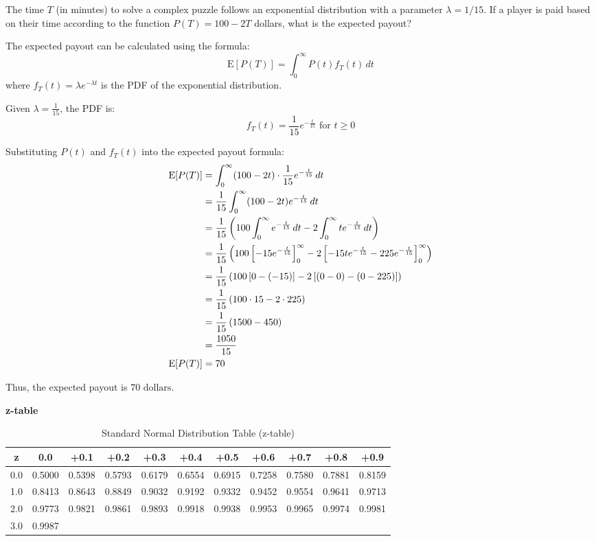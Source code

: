 \documentclass[a4paper, 10pt]{article}
\newcommand{\zScoreTable}[1]{
    \par\noindent \textbf{z-table}
    \begin{table}[h]
        \centering
        \renewcommand{\arraystretch}{#1}
        \begin{tabular}{|c|cccccccccc|}
            \hline
            \textbf{z} & 0.0 & +0.1 & +0.2 & +0.3 & +0.4 & +0.5 & +0.6 & +0.7 & +0.8 & +0.9 \\
            \hline
            0.0 & 0.5000 & 0.5398 & 0.5793 & 0.6179 & 0.6554 & 0.6915 & 0.7258 & 0.7580 & 0.7881 & 0.8159 \\
            1.0 & 0.8413 & 0.8643 & 0.8849 & 0.9032 & 0.9192 & 0.9332 & 0.9452 & 0.9554 & 0.9641 & 0.9713 \\
            2.0 & 0.9773 & 0.9821 & 0.9861 & 0.9893 & 0.9918 & 0.9938 & 0.9953 & 0.9965 & 0.9974 & 0.9981 \\
            3.0 & 0.9987 & & & & & & & & & \\
            \hline
        \end{tabular}
        \caption{Standard Normal Distribution Table (z-table)}
        \label{tab:z-table}
    \end{table}
}
\begin{document}
\newpage

\begin{problem}
The time \( T \) (in minutes) to solve a complex puzzle follows an exponential distribution with a parameter \( \lambda = 1/15 \).
If a player is paid based on their time according to the function \( P(T) = 100 - 2T \) dollars, what is the expected payout?
\end{problem}

\begin{solution}
	The expected payout can be calculated using the formula:
	\[ \text{E}[P(T)] = \int_{0}^{\infty} P(t) f_T(t) \, dt \]
	where \( f_T(t) = \lambda e^{-\lambda t} \) is the PDF of the exponential distribution.

	Given \( \lambda = \frac{1}{15} \), the PDF is:
	\[ f_T(t) = \frac{1}{15} e^{-\frac{t}{15}} \text{ for } t \geq 0 \]

	Substituting \( P(t) \) and \( f_T(t) \) into the expected payout formula:
	\begin{align*}
		\text{E}[P(T)] & = \int_{0}^{\infty} (100 - 2t) \cdot \frac{1}{15} e^{-\frac{t}{15}} \, dt                                                                          \\
		               & = \frac{1}{15} \int_{0}^{\infty} (100 - 2t) e^{-\frac{t}{15}} \, dt                                                                                \\
		               & = \frac{1}{15} \left(100 \int_{0}^{\infty} e^{-\frac{t}{15}} \, dt - 2 \int_{0}^{\infty} t e^{-\frac{t}{15}} \, dt\right)                               \\
		               & = \frac{1}{15} \left(100 \left[-15e^{-\frac{t}{15}}\right]_{0}^{\infty} - 2 \left[-15te^{-\frac{t}{15}} - 225e^{-\frac{t}{15}}\right]_{0}^{\infty}\right) \\
		               & = \frac{1}{15} \left(100 \left[0 - (-15)\right] - 2 \left[(0 - 0) - (0 - 225)\right]\right)                                                               \\
		               & = \frac{1}{15} \left(100 \cdot 15 - 2 \cdot 225\right)                                                                                                  \\
		               & = \frac{1}{15} \left(1500 - 450\right)                                                                                                                  \\
		               & = \frac{1050}{15}                                                                                                                                  \\
		\text{E}[P(T)] & = 70
	\end{align*}

	Thus, the expected payout is \( \boxed{70 \text{ dollars}} \).
\end{solution}

\vspace{1.5cm}

\zScoreTable{1.2}
\end{document}
